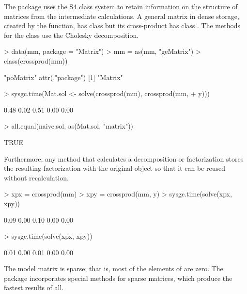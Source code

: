 \documentclass{article}
\begin{document}
The  package uses the S4 class system
\citep{R:Chambers:1998} to retain information on the structure of
matrices from the intermediate calculations.  A general matrix in
dense storage, created by the  function, has class
 but its cross-product has class .
The  methods for the  class use the
Cholesky decomposition.
\begin{Schunk}
\begin{Sinput}
> data(mm, package = "Matrix")
> mm = as(mm, "geMatrix")
> class(crossprod(mm))
\end{Sinput}
\begin{Soutput}
[1] "poMatrix"
attr(,"package")
[1] "Matrix"
\end{Soutput}
\begin{Sinput}
> sysgc.time(Mat.sol <- solve(crossprod(mm), crossprod(mm, 
+     y)))
\end{Sinput}
\begin{Soutput}
[1] 0.48 0.02 0.51 0.00 0.00
\end{Soutput}
\begin{Sinput}
> all.equal(naive.sol, as(Mat.sol, "matrix"))
\end{Sinput}
\begin{Soutput}
[1] TRUE
\end{Soutput}
\end{Schunk}

Furthermore, any method that calculates a
decomposition or factorization stores the resulting factorization with
the original object so that it can be reused without recalculation.
\begin{Schunk}
\begin{Sinput}
> xpx = crossprod(mm)
> xpy = crossprod(mm, y)
> sysgc.time(solve(xpx, xpy))
\end{Sinput}
\begin{Soutput}
[1] 0.09 0.00 0.10 0.00 0.00
\end{Soutput}
\begin{Sinput}
> sysgc.time(solve(xpx, xpy))
\end{Sinput}
\begin{Soutput}
[1] 0.01 0.00 0.01 0.00 0.00
\end{Soutput}
\end{Schunk}

The model matrix  is sparse; that is, most of the elements of
 are zero.  The  package incorporates special
methods for sparse matrices, which produce the fastest results of all.
\end{document}

